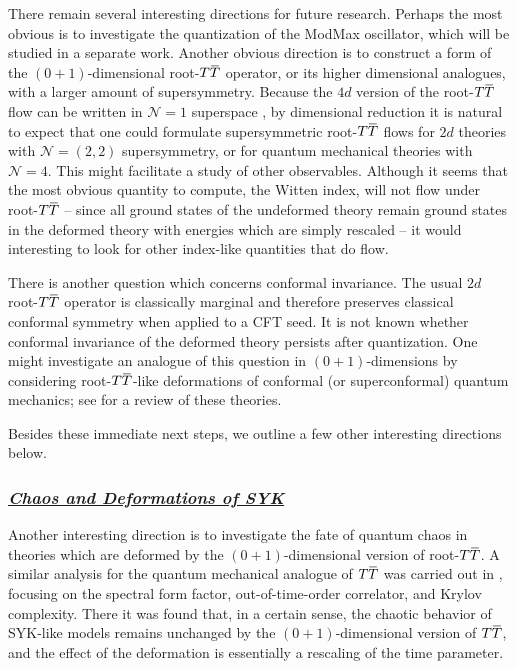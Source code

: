 \documentclass[12pt]{article}
\numberwithin{equation}{section}
\newcommand{\ul}{\underline}
\newcommand{\overbar}[1]{\mkern 1.5mu\overline{\mkern-1.5mu#1\mkern-1.5mu}\mkern 1.5mu}
\def\TT{{T\overbar{T}}}
\begin{document}
There remain several interesting directions for future research. Perhaps the most obvious is to investigate the quantization of the ModMax oscillator, which will be studied in a separate work. Another obvious direction is to construct a form of the $(0+1)$-dimensional root-$\TT$ operator, or its higher dimensional analogues, with a larger amount of supersymmetry. Because the $4d$ version of the root-$\TT$ flow can be written in $\mathcal{N} = 1$ superspace \cite{Ferko:2023ruw}, by dimensional reduction it is natural to expect that one could formulate supersymmetric root-$\TT$ flows for $2d$ theories with $\mathcal{N} = (2, 2)$ supersymmetry, or for quantum mechanical theories with $\mathcal{N} = 4$. This might facilitate a study of other observables. Although it seems that the most obvious quantity to compute, the Witten index, will not flow under root-$\TT$ -- since all ground states of the undeformed theory remain ground states in the deformed theory with energies which are simply rescaled -- it would interesting to look for other index-like quantities that do flow. 

There is another question which concerns conformal invariance. The usual $2d$ root-$\TT$ operator is classically marginal and therefore preserves classical conformal symmetry when applied to a CFT seed. It is not known whether conformal invariance of the deformed theory persists after quantization. One might investigate an analogue of this question in $(0+1)$-dimensions by considering root-$\TT$-like deformations of conformal (or superconformal) quantum mechanics; see \cite{Britto-Pacumio:1999dnb} for a review of these theories.

Besides these immediate next steps, we outline a few other interesting directions below.

\subsubsection*{\ul{\it Chaos and Deformations of SYK}}

Another interesting direction is to investigate the fate of quantum chaos in theories which are deformed by the $(0+1)$-dimensional version of root-$\TT$. A similar analysis for the quantum mechanical analogue of $\TT$ was carried out in \cite{He:2022ryk}, focusing on the spectral form factor, out-of-time-order correlator, and Krylov complexity. There it was found that, in a certain sense, the chaotic behavior of SYK-like models remains unchanged by the $(0+1)$-dimensional version of $\TT$, and the effect of the deformation is essentially a rescaling of the time parameter. 
\end{document}

